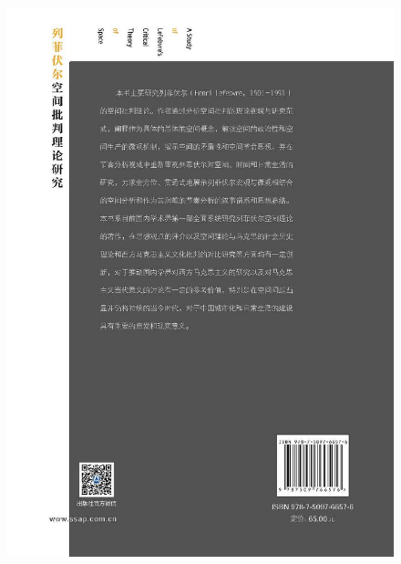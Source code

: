 \documentclass[UTF8, fontset = sourcesans, a4paper, oneside, zihao =
-4, scheme=chinese, no-math, space=true]{ctexbook}
\makeatletter
\def\maxwidth{\ifdim\Gin@nat@width>\linewidth\linewidth
\else\Gin@nat@width\fi}
\let\Oldincludegraphics\includegraphics
\renewcommand{\includegraphics}[1]{\Oldincludegraphics[width=\maxwidth]{#1}}
\makeatother
\begin{document}
\begin{figure}[!tbp]
  \centering
\includegraphics{images/00006.jpeg}
\end{figure}
\end{document}
